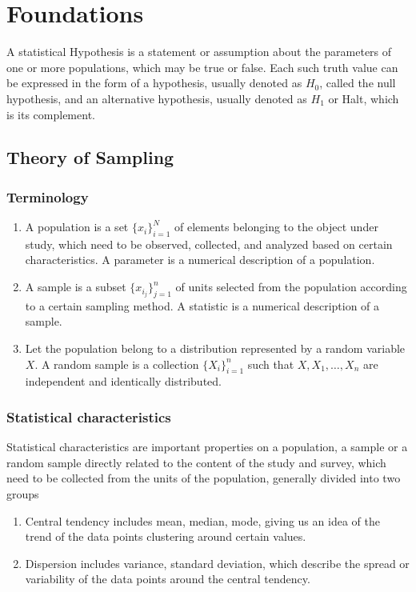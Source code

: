 \chapter{Foundations}

A statistical Hypothesis is a statement or assumption about the parameters of one or more populations, which may be true or false. Each such truth value can be expressed in the form of a hypothesis, usually denoted as $H_0$, called the null hypothesis, and an alternative hypothesis, usually denoted as $H_1$ or Halt, which is its complement.

\section{Theory of Sampling}
\subsection{Terminology}
\begin{enumerate}
 \item A population is a set $\{x_i\}_{i=1}^N$ of elements belonging to the object under study, which need to be observed, collected, and analyzed based on certain characteristics. A parameter is a numerical description of a population.
 \item A sample is a subset $\{x_{i_j}\}_{j=1}^n$ of units selected from the population according to a certain sampling method. A statistic is a numerical description of a sample.
 \item Let the population belong to a distribution represented by a random variable $X$. A random sample is a collection $\{X_i\}_{i=1}^n$ such that $X,X_1,\ldots,X_n$ are independent and identically distributed.
\end{enumerate}

\subsection{Statistical characteristics}

Statistical characteristics are important properties on a population, a sample or a random sample directly related to the content of the study and survey, which need to be collected from the units of the population, generally divided into two groups

\begin{enumerate}
 \item Central tendency includes mean, median, mode, giving us an idea of the trend of the data points clustering around certain values.
 \item Dispersion includes variance, standard deviation, which describe the spread or variability of the data points around the central tendency.
\end{enumerate}

